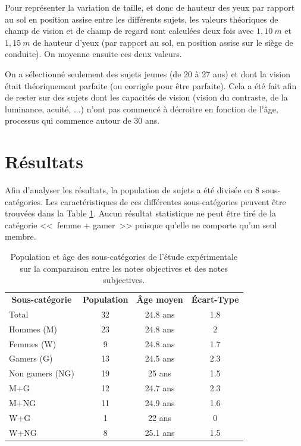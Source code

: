 	\par Pour représenter la variation de taille, et donc de hauteur des yeux par rapport au sol en position assise entre les différents sujets, les valeurs théoriques de champ de vision et de champ de regard sont calculées deux fois avec $1,10~m$ et $1,15~m$ de hauteur d'yeux (par rapport au sol, en position assise sur le siège de conduite). On moyenne ensuite ces deux valeurs.
	
	\par On a sélectionné seulement des sujets jeunes (de 20 à 27 ans) et dont la vision était théoriquement parfaite (ou corrigée pour être parfaite). Cela a été fait afin de rester sur des sujets dont les capacités de vision (vision du contraste, de la luminance, acuité, ...) n'ont pas commencé à décroitre en fonction de l'âge, processus qui commence autour de 30 ans.
	
	\section{Résultats}
	\par Afin d'analyser les résultats, la population de sujets a été divisée en 8 sous-catégories. Les caractéristiques de ces différentes sous-catégories peuvent être trouvées dans la Table \ref{tab:subpopulations}. Aucun résultat statistique ne peut être tiré de la catégorie <<~femme + gamer~>> puisque qu'elle ne comporte qu'un seul membre.
	
	\begin{table}[h]
		\centering
		\caption{Population et âge des sous-catégories de l'étude expérimentale sur la comparaison entre les notes objectives et des notes subjectives.}
		\label{tab:subpopulations}
		\small
		\begin{tabular}{lccc}
			\multicolumn{1}{c}{\bfseries Sous-catégorie} & \multicolumn{1}{c}{\bfseries Population} & \multicolumn{1}{c}{\bfseries Âge moyen} & \multicolumn{1}{c}{\bfseries Écart-Type}\\
			Total & 32 & 24.8 ans & 1.8\\			
			Hommes (M) & 23 & 24.8 ans & 2\\
			Femmes (W) & 9 & 24.8 ans & 1.7\\
			Gamers (G) & 13 & 24.5 ans & 2.3\\
			Non gamers (NG) & 19 & 25 ans & 1.5\\
			M+G & 12 & 24.7 ans & 2.3\\
			M+NG & 11 & 24.9 ans & 1.6\\
			W+G & 1 & 22 ans & 0\\
			W+NG & 8 & 25.1 ans & 1.5\\
		\end{tabular}
	\end{table}
	
